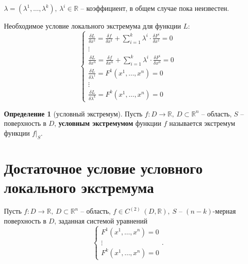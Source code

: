 \documentclass{report}
\theoremstyle{definition}
\newtheorem{definition}{Определение}[section]
\begin{document}
$\lambda = (\lambda^1,\ldots,\lambda^k), \ \lambda^i \in \mathbb{R}$ -- коэффициент, в общем случае пока неизвестен.

Необходимое условие локального экстремума для функции $L:$
\begin{equation}
  \left\{\begin{array}{l}
    \frac{\delta L}{\delta x^1} = \frac{\delta f}{\delta x^1} + \sum_{i = 1}^{k}\lambda^i\cdot\frac{\delta F^i}{\delta x^1} = 0 \\
    \vdots                                                                                                                      \\
    \frac{\delta L}{\delta x^n} = \frac{\delta f}{\delta x^n} + \sum_{i = 1}^{k}\lambda^i\cdot\frac{\delta F^i}{\delta x^n} = 0 \\
    \frac{\delta L}{\delta \lambda^1} = F^1(x^1,\ldots,x^n) = 0                                                                 \\
    \vdots                                                                                                                      \\
    \frac{\delta L}{\delta \lambda^k} = F^k(x^1,\ldots,x^n) = 0
  \end{array}\right.
\end{equation}

\begin{definition}[условный экстремум]
  Пусть $f:D\rightarrow\mathbb{R}, \ D \subset \mathbb{R}^n$ -- область, $S$ -- поверхность в $D$, \textbf{условным экстремумом} функции $f$ называется экстремум функции $f\big|_S$.
\end{definition}

\section*{Достаточное условие условного локального экстремума}

Пусть $f:D\rightarrow\mathbb{R}, \ D \subset \mathbb{R}^n$ -- область, $f \in C^{(2)} \ (D,\mathbb{R}), \ S$ -- $(n-k)$-мерная поверхность в $D$, заданная системой уравнений
\begin{equation*}
  \left\{\begin{array}{l}
    F^1(x^1,\ldots,x^n) = 0 \\
    \vdots                  \\
    F^k(x^1,\ldots,x^n) = 0
  \end{array}\right..
\end{equation*}
\end{document}
